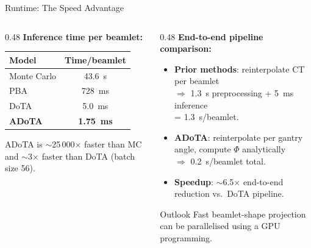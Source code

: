 \documentclass[aspectratio=169, 10pt]{beamer}
\begin{document}
\begin{frame}{Runtime: The Speed Advantage}
  \begin{columns}[T]
    \begin{column}{0.48\textwidth}
      \textbf{Inference time per beamlet:}
      \begin{table}
        \centering\small
        \begin{tabular}{lc}
          \toprule
          \textbf{Model} & \textbf{Time/beamlet} \\
          \midrule
          Monte Carlo       & \SI{43.6}{s}  \\
          PBA               & \SI{728}{ms}  \\
          DoTA              & \SI{5.0}{ms}  \\
          \textbf{ADoTA}    & \textbf{\SI{1.75}{ms}} \\
          \bottomrule
        \end{tabular}
      \end{table}

      \vspace{4pt}
      {\small ADoTA is $\sim$25\,000$\times$ faster than MC and
       $\sim$3$\times$ faster than DoTA (batch size 56).}
    \end{column}
    \begin{column}{0.48\textwidth}
      \textbf{End-to-end pipeline comparison:}

      \vspace{4pt}
      \begin{itemize}\setlength{\itemsep}{4pt}
        \item \textbf{Prior methods}: reinterpolate CT per beamlet\\
              $\Rightarrow$ \SI{1.3}{s} preprocessing +
              \SI{5}{ms} inference\\
              = \SI{1.3}{s}/beamlet.
        \item \textbf{ADoTA}: reinterpolate per gantry angle,
              compute $\Phi$ analytically\\
              $\Rightarrow$ \SI{0.2}{s}/beamlet total.
        \item \textbf{Speedup}: $\sim$6.5$\times$ end-to-end
              reduction vs.\ DoTA pipeline.
      \end{itemize}

      \vspace{6pt}
      \begin{block}{Outlook}
        Fast beamlet-shape projection can be parallelised using a GPU programming.
      \end{block}
    \end{column}
  \end{columns}
\end{frame}
\end{document}
